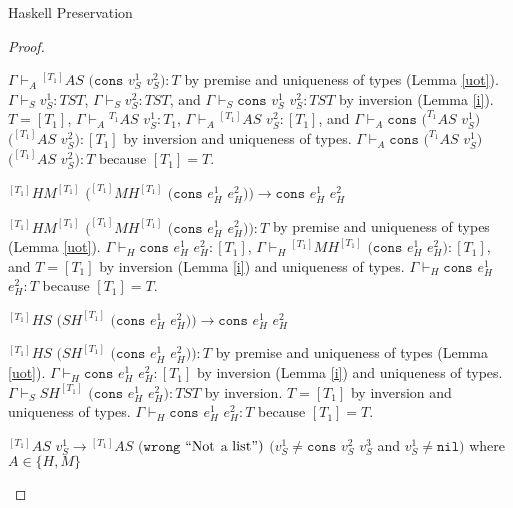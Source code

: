 \begin{theorem}{Haskell Preservation}
\begin{proof}
\begin{case}
$\Gamma\vdash_{A}{^{[T_{1}]}A}S$ $(\mathtt{cons}$ $v_{S}^{1}$ $v_{S}^{2}):T$ by premise and uniqueness of types (Lemma \ref{uot}).  $\Gamma\vdash_{S}v_{S}^{1}:TST$, $\Gamma\vdash_{S}v_{S}^{2}:TST$, and $\Gamma\vdash_{S}\mathtt{cons}$ $v_{S}^{1}$ $v_{S}^{2}:TST$ by inversion (Lemma \ref{i}).  $T=[T_{1}]$, $\Gamma\vdash_{A}{^{T_{1}}A}S$ $v_{S}^{1}:T_{1}$, $\Gamma\vdash_{A}{^{[T_{1}]}A}S$ $v_{S}^{2}:[T_{1}]$, and $\Gamma\vdash_{A}\mathtt{cons}$ $(^{T_{1}}AS$ $v_{S}^{1})$ $(^{[T_{1}]}AS$ $v_{S}^{2}):[T_{1}]$ by inversion and uniqueness of types.  $\Gamma\vdash_{A}\mathtt{cons}$ $(^{T_{1}}AS$ $v_{S}^{1})$ $(^{[T_{1}]}AS$ $v_{S}^{2}):T$ because $[T_{1}]=T$.
\end{case}


\begin{case}
$^{[T_{1}]}HM^{[T_{1}]}$ $(^{[T_{1}]}MH^{[T_{1}]}$ $(\mathtt{cons}$ $e_{H}^{1}$ $e_{H}^{2}))\rightarrow\mathtt{cons}$ $e_{H}^{1}$ $e_{H}^{2}$

$^{[T_{1}]}HM^{[T_{1}]}$ $(^{[T_{1}]}MH^{[T_{1}]}$ $(\mathtt{cons}$ $e_{H}^{1}$ $e_{H}^{2})):T$ by premise and uniqueness of types (Lemma \ref{uot}).  $\Gamma\vdash_{H}\mathtt{cons}$ $e_{H}^{1}$ $e_{H}^{2}:[T_{1}]$, $\Gamma\vdash_{H}{^{[T_{1}]}M}H^{[T_{1}]}$ $(\mathtt{cons}$ $e_{H}^{1}$ $e_{H}^{2}):[T_{1}]$, and $T=[T_{1}]$ by inversion (Lemma \ref{i}) and uniqueness of types.  $\Gamma\vdash_{H}\mathtt{cons}$ $e_{H}^{1}$ $e_{H}^{2}:T$ because $[T_{1}]=T$.
\end{case}


\begin{case}
$^{[T_{1}]}HS$ $(SH^{[T_{1}]}$ $(\mathtt{cons}$ $e_{H}^{1}$ $e_{H}^{2}))\rightarrow\mathtt{cons}$ $e_{H}^{1}$ $e_{H}^{2}$

$^{[T_{1}]}HS$ $(SH^{[T_{1}]}$ $(\mathtt{cons}$ $e_{H}^{1}$ $e_{H}^{2})):T$ by premise and uniqueness of types (Lemma \ref{uot}).  $\Gamma\vdash_{H}\mathtt{cons}$ $e_{H}^{1}$ $e_{H}^{2}:[T_{1}]$ by inversion (Lemma \ref{i}) and uniqueness of types.  $\Gamma\vdash_{S}SH^{[T_{1}]}$ $(\mathtt{cons}$ $e_{H}^{1}$ $e_{H}^{2}):TST$ by inversion.  $T=[T_{1}]$ by inversion and uniqueness of types.  $\Gamma\vdash_{H}\mathtt{cons}$ $e_{H}^{1}$ $e_{H}^{2}:T$ because $[T_{1}]=T$.
\end{case}


\begin{case}
$^{[T_{1}]}AS$ $v_{S}^{1}\rightarrow{^{[T_{1}]}A}S$ $(\mathtt{wrong}$ $\mathrm{``Not}$ $\mathrm{a}$ $\mathrm{list"})$ $(v_{S}^{1}\neq\mathtt{cons}$ $v_{S}^{2}$ $v_{S}^{3}$ and $v_{S}^{1}\neq\mathtt{nil})$ where $A\in\lbrace H,M\rbrace$


\end{case}
\end{proof}
\end{theorem}
